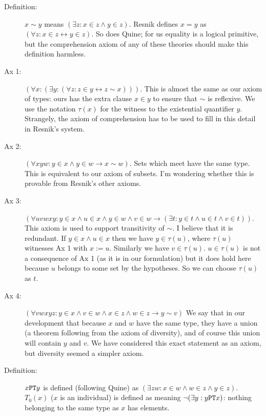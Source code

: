 \documentclass[12pt]{article}
\begin{document}
\begin{description}

\item[Definition:]  $x \sim y$ means $(\exists z:x \in z \wedge y \in z)$.  Resnik defines
$x=y$ as $(\forall z:x \in z \leftrightarrow y \in z)$.  So does Quine; for us equality is a logical primitive, but the comprehension axiom
of any of these theories should make this definition harmless.

\item[Ax 1:]  $(\forall x:(\exists y:(\forall z:z \in y \leftrightarrow z \sim x)))$.  This is almost the same as our axiom of types:  ours has the extra clause $x \in y$ to ensure that $\sim$ is reflexive.  We use the notation $\tau(x)$ for the witness to the existential quantifier $y$.  Strangely, the axiom of comprehension has to be used to fill in this detail in Resnik's system.

\item[Ax 2:] $(\forall xyw:y \in x \wedge y \in w \rightarrow x \sim w)$.  Sets which meet have the same type.   This is equivalent to our axiom of subsets.  I'm wondering whether this is provable from Resnik's other axioms.  

\item[Ax 3:]  $(\forall uvwxy:  y \in x \wedge u \in x \wedge y \in w \wedge v \in w \rightarrow (\exists t:y \in t \wedge u \in t \wedge v \in t))$.  This axiom is used to support transitivity of $\sim$.  I believe that it is redundant.  If $y \in x \wedge u \in x$ then we have $y \in \tau(u)$, where $\tau(u)$ witnesses
Ax 1 with $x := u$.  Similarly we have $v \in \tau(u)$.  $u \in \tau(u)$ is not a consequence of Ax 1 (as it is in our formulation) but it does hold here because
$u$ belongs to some set by the hypotheses.  So we can choose $\tau(u)$ as $t$.

\item[Ax 4:]  $(\forall vwxyz:y \in x \wedge v \in w \wedge x \in z \wedge w \in z \rightarrow y \sim v)$  We say that in our development that because $x$ and $w$ have the same type, they have a union (a theorem following from the axiom of diversity), and of course this union will contain $y$ and $v$.  We have considered this exact statement as an axiom, but diversity seemed a simpler axiom.

\item[Definition:]  $x {\tt PT} y$ is defined (following Quine) as $(\exists zw:x \in w \wedge w \in z \wedge y \in z)$.  $T_0(x)$ ($x$ is an individual)
is defined as meaning $\neg(\exists y:y {\tt PT} x)$:  nothing belonging to the same type as $x$ has elements.


\end{description}
\end{document}
